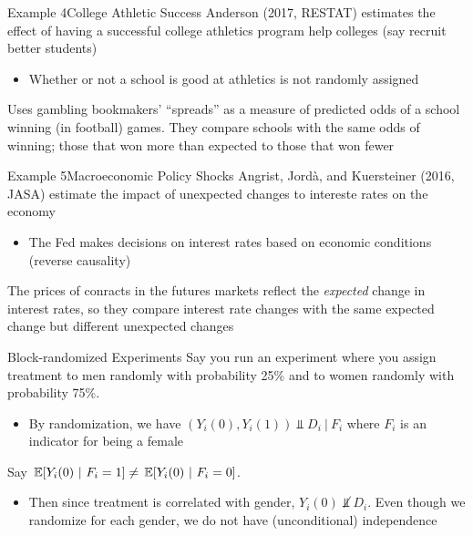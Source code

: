 \documentclass[aspectratio=169,t,11pt,table]{beamer}
\begin{document}
\begin{frame}{Example 4}{College Athletic Success}
  Anderson (2017, RESTAT) estimates the effect of having a successful college athletics program help colleges (say recruit better students)

  \begin{itemize}
    \item Whether or not a school is good at athletics is not randomly assigned
  \end{itemize}
  
  Uses gambling bookmakers' ``spreads'' as a measure of predicted odds of a school winning (in football) games. They compare schools with the same odds of winning; those that won more than expected to those that won fewer
\end{frame}

\begin{frame}{Example 5}{Macroeconomic Policy Shocks}
  Angrist, Jordà, and Kuersteiner (2016, JASA) estimate the impact of unexpected changes to intereste rates on the economy

  \begin{itemize}
    \item The Fed makes decisions on interest rates based on economic conditions (reverse causality)
  \end{itemize}

  The prices of conracts in the futures markets reflect the \emph{expected} change in interest rates, so they compare interest rate changes with the same expected change but different unexpected changes
\end{frame}


\begin{frame}{Block-randomized Experiments}
  Say you run an experiment where you assign treatment to men randomly with probability 25\% and to women randomly with probability 75\%. 
  \begin{itemize}
    \item By randomization, we have $ (Y_{i}(0), Y_{i}(1)) \Perp D_i \ \vert \ F_i$ where $F_i$ is an indicator for being a female
  \end{itemize}

  \pause
  \bigskip
  Say $\expec{Y_i(0)}{F_i = 1} \neq \expec{Y_i(0)}{F_i = 0}$. 
  \begin{itemize}
    \item Then since treatment is correlated with gender, $Y_{i}(0) \not\Perp D_i$. Even though we randomize for each gender, we do not have (unconditional) independence
  \end{itemize}
\end{frame}
\end{document}
